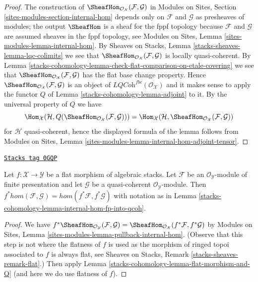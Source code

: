 \begin{proof}
The construction of
$\SheafHom_{\mathcal{O}_\mathcal{X}}(\mathcal{F}, \mathcal{G})$ in
Modules on Sites, Section \ref{sites-modules-section-internal-hom}
depends only on $\mathcal{F}$ and $\mathcal{G}$ as presheaves
of modules; the output $\SheafHom$ is a sheaf for the fppf
topology because $\mathcal{F}$ and $\mathcal{G}$ are assumed
sheaves in the fppf topology, see
Modules on Sites, Lemma \ref{sites-modules-lemma-internal-hom}.
By Sheaves on Stacks, Lemma \ref{stacks-sheaves-lemma-lqc-colimits}
we see that $\SheafHom_{\mathcal{O}_\mathcal{X}}(\mathcal{F}, \mathcal{G})$
is locally quasi-coherent.
By Lemma \ref{stacks-cohomology-lemma-check-flat-comparison-on-etale-covering}
we see that $\SheafHom_{\mathcal{O}_\mathcal{X}}(\mathcal{F}, \mathcal{G})$
has the flat base change property. Hence
$\SheafHom_{\mathcal{O}_\mathcal{X}}(\mathcal{F}, \mathcal{G})$
is an object of $\textit{LQCoh}^{fbc}(\mathcal{O}_\mathcal{X})$
and it makes sense to apply the functor $Q$ of Lemma \ref{stacks-cohomology-lemma-adjoint}
to it. By the universal property of $Q$ we have
$$
\Hom_\mathcal{X}(\mathcal{H},
Q(\SheafHom_{\mathcal{O}_\mathcal{X}}(\mathcal{F}, \mathcal{G}))) =
\Hom_\mathcal{X}(\mathcal{H},
\SheafHom_{\mathcal{O}_\mathcal{X}}(\mathcal{F}, \mathcal{G}))
$$
for $\mathcal{H}$ quasi-coherent, hence the displayed formula
of the lemma follows from Modules on Sites, Lemma
\ref{sites-modules-lemma-internal-hom-adjoint-tensor}.
\end{proof}

\begin{lemma}
\label{stacks-cohomology-lemma-flat-morphism-and-hom}
\href{https://stacks.math.columbia.edu/tag/0GQP}{\texttt{Stacks tag 0GQP}}

Let $f : \mathcal{X} \to \mathcal{Y}$ be a flat morphism of algebraic stacks.
Let $\mathcal{F}$ be an
$\mathcal{O}_\mathcal{Y}$-module of finite presentation and let
$\mathcal{G}$ be a quasi-coherent $\mathcal{O}_\mathcal{Y}$-module.
Then $f^*hom(\mathcal{F}, \mathcal{G}) = hom(f^*\mathcal{F}, f^*\mathcal{G})$
with notation as in Lemma \ref{stacks-cohomology-lemma-internal-hom-fp-into-qcoh}.
\end{lemma}

\begin{proof}
We have $f^*\SheafHom_{\mathcal{O}_\mathcal{Y}}(\mathcal{F}, \mathcal{G}) =
\SheafHom_{\mathcal{O}_\mathcal{X}}(f^*\mathcal{F}, f^*\mathcal{G})$
by Modules on Sites, Lemma \ref{sites-modules-lemma-pullback-internal-hom}.
(Observe that this step is not where the flatness of $f$ is used
as the morphism of ringed topoi associated to $f$ is always flat, see
Sheaves on Stacks, Remark \ref{stacks-sheaves-remark-flat}.)
Then apply Lemma \ref{stacks-cohomology-lemma-flat-morphism-and-Q} (and here we do use
flatness of $f$).
\end{proof}

